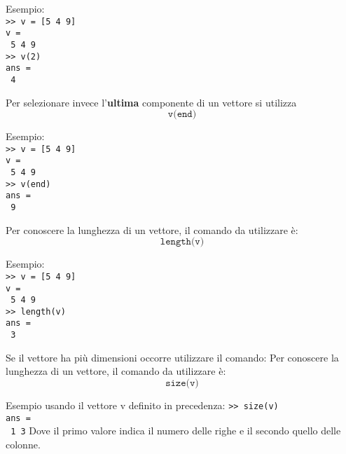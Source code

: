 Esempio: \\
\texttt{>> v = [5 4 9]} \\
\texttt{v = } \\
\texttt{\hspace{0.5cm} 5 \hspace{0.5cm} 4 \hspace{0.5cm} 9} \\
\texttt{>> v(2)} \\
\texttt{ans = } \\
\texttt{\hspace{0.5cm} 4} \break

Per selezionare invece l'\textbf{ultima} componente di un vettore si utilizza
$$ \texttt{v(end)} $$

Esempio: \\
\texttt{>> v = [5 4 9]} \\
\texttt{v = } \\
\texttt{\hspace{0.5cm} 5 \hspace{0.5cm} 4 \hspace{0.5cm} 9} \\
\texttt{>> v(end)} \\
\texttt{ans = } \\
\texttt{\hspace{0.5cm} 9} \break

Per conoscere la lunghezza di un vettore, il comando da utilizzare è:
$$\texttt{length(v)} $$

Esempio: \\
\texttt{>> v = [5 4 9]} \\
\texttt{v = } \\
\texttt{\hspace{0.5cm} 5 \hspace{0.5cm} 4 \hspace{0.5cm} 9} \\
\texttt{>> length(v)} \\
\texttt{ans = } \\
\texttt{\hspace{0.5cm} 3} \break

Se il vettore ha più dimensioni occorre utilizzare il comando:
Per conoscere la lunghezza di un vettore, il comando da utilizzare è:
$$\texttt{size(v)} $$

Esempio usando il vettore v definito in precedenza: 
\texttt{>> size(v)} \\
\texttt{ans = } \\
\texttt{\hspace{0.5cm} 1 \hspace{0.5cm} 3} \break
Dove il primo valore indica il numero delle righe e il secondo quello delle colonne.


